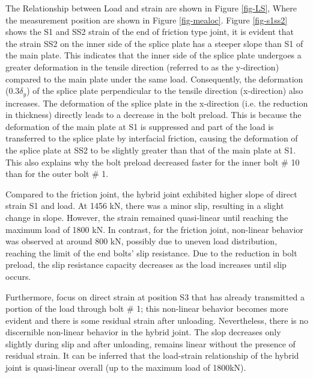 The Relationship between Load and strain are shown in Figure \ref{fig-LS}, Where the measurement position are shown in Figure \ref{fig-mealoc}. Figure \ref{fig-s1ss2} shows the S1 and SS2 strain of the end of friction type joint, it is evident that the strain SS2 on the inner side of the splice plate has a steeper slope than S1 of the main plate. This indicates that the inner side of the splice plate undergoes a greater deformation in the tensile direction (referred to as the y-direction) compared to the main plate under the same load. Consequently, the deformation ($0.3\delta_y$) of the splice plate perpendicular to the tensile direction (x-direction) also increases. The deformation of the splice plate in the x-direction (i.e. the reduction in thickness) directly leads to a decrease in the bolt preload. This is because the deformation of the main plate at S1 is suppressed and part of the load is transferred to the splice plate by interfacial friction, causing the deformation of the splice plate at SS2 to be slightly greater than that of the main plate at S1. This also explains why the bolt preload decreased faster for the inner bolt \# 10 than for the outer bolt \# 1.

Compared to the friction joint, the hybrid joint exhibited higher slope of direct strain S1 and load. At 1456 kN, there was a minor slip, resulting in a slight change in slope. However, the strain remained quasi-linear until reaching the maximum load of 1800 kN. In contrast, for the friction joint, non-linear behavior was observed at around 800 kN, possibly due to uneven load distribution, reaching the limit of the end bolts' slip resistance. Due to the reduction in bolt preload, the slip resistance capacity decreases as the load increases until slip occurs.

Furthermore, focus on direct strain at position S3 that has already transmitted a portion of the load through bolt \# 1; this non-linear behavior becomes more evident and there is some residual strain after unloading. Nevertheless, there is no discernible non-linear behavior in the hybrid joint. The slop decreases only slightly during slip and after unloading, remains linear without the presence of residual strain. It can be inferred that the load-strain relationship of the hybrid joint is quasi-linear overall (up to the maximum load of 1800kN).

